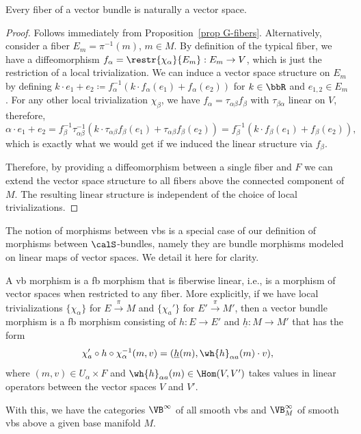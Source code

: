 \begin{prop}
    Every fiber of a vector bundle is naturally a vector space.
\end{prop}
\begin{proof}
    Follows immediately from Proposition~\ref{prop G-fibers}. Alternatively, consider a fiber $E_m=\pi^{-1}(m)$, $m\in M$. By definition of the typical fiber, we have a diffeomorphism $f_\alpha=\restr{\chi_\alpha}{E_m}:E_m\to V$, which is just the restriction of a local trivialization. We can induce a vector space structure on $E_m$ by defining $k\cdot e_1+e_2\coloneqq f_\alpha^{-1}(k\cdot f_\alpha(e_1)+f_\alpha(e_2))$ for $k\in \bbR $ and $e_{1,2}\in E_m$. For any other local trivialization $\chi_\beta$, we have $f_\alpha=\tau_{\alpha\beta}f_\beta$ with $\tau_{\beta\alpha}$ linear on $V$, therefore, 
    \[
    \alpha\cdot e_1+e_2=f_\beta^{-1}\tau_{\alpha\beta}^{-1}(k\cdot \tau_{\alpha\beta}f_\beta(e_1)+\tau_{\alpha\beta}f_\beta(e_2))=f_\beta^{-1}(k\cdot f_\beta(e_1)+f_\beta(e_2)),
    \] 
    which is exactly what we would get if we induced the linear structure via $f_\beta$.
    
    Therefore, by providing a diffeomorphism between a single fiber and $F$ we can extend the vector space structure to all fibers above the connected component of $M$. The resulting linear structure is independent of the choice of local trivializations.
\end{proof}

The notion of morphisms between \glspl{vb} is a special case of our definition of morphisms between $\calS$-bundles, namely they are bundle morphisms modeled on linear maps of vector spaces. We detail it here for clarity.

\begin{defn}
    A \gls{vb} morphism is a \gls{fb} morphism that is fiberwise linear, i.e., is a morphism of vector spaces when restricted to any fiber. More explicitly, if we have  local trivializations $\{\chi_\alpha\}$ for $E\overset{\pi}{\to}M$ and $\{\chi_a'\}$ for $E'\overset{\pi}{\to}M'$, then a vector bundle morphism is a \gls{fb} morphism consisting of $h:E\to E'$ and $\underline{h}:M\to M'$ that has the form 
    \[\chi_a '\circ h \circ \chi_\alpha^{-1}(m,v)=(\underline{h}(m),\wh{h}_{\alpha a}(m)\cdot v),\]
    where $(m,v)\in U_\alpha\times F$ and $\wh{h}_{\alpha a}(m)\in \Hom(V,V')$ takes values in linear operators between the vector spaces $V$ and $V'$.

    With this, we have the categories $\VB^\infty $ of all smooth \glspl{vb} and $\VB^\infty_M$ of smooth \glspl{vb} above a given base manifold $M$.
\end{defn}


